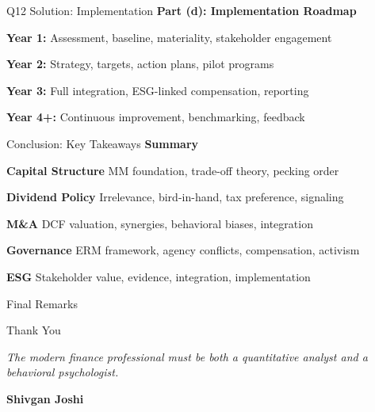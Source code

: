 \documentclass[aspectratio=169,10pt]{beamer}
\renewcommand{\small}{\fontsize{6pt}{7.5pt}\selectfont}
\renewcommand{\large}{\fontsize{8pt}{10pt}\selectfont}
\renewcommand{\Large}{\fontsize{9pt}{11pt}\selectfont}
\newcommand{\question}[1]{{\large\bfseries\color{crimson}#1}}
\begin{document}
	\begin{frame}{Q12 Solution: Implementation}
		\question{Part (d): Implementation Roadmap}
		\small
		
		\textbf{Year 1:} Assessment, baseline, materiality, stakeholder engagement
		
		\vspace{0.1cm}
		\textbf{Year 2:} Strategy, targets, action plans, pilot programs
		
		\vspace{0.1cm}
		\textbf{Year 3:} Full integration, ESG-linked compensation, reporting
		
		\vspace{0.1cm}
		\textbf{Year 4+:} Continuous improvement, benchmarking, feedback
	\end{frame}
	
	\begin{frame}{Conclusion: Key Takeaways}
		\question{Summary}
		\small
		
		\textbf{Capital Structure}
		MM foundation, trade-off theory, pecking order
		
		\vspace{0.1cm}
		\textbf{Dividend Policy}
		Irrelevance, bird-in-hand, tax preference, signaling
		
		\vspace{0.1cm}
		\textbf{M\&A}
		DCF valuation, synergies, behavioral biases, integration
		
		\vspace{0.1cm}
		\textbf{Governance}
		ERM framework, agency conflicts, compensation, activism
		
		\vspace{0.1cm}
		\textbf{ESG}
		Stakeholder value, evidence, integration, implementation
	\end{frame}
	
	\begin{frame}{Final Remarks}
		\begin{center}
			\Large\textcolor{navyblue}{Thank You}
			\vspace{0.2cm}
			
			\small
			\textit{The modern finance professional must be both a quantitative analyst and a behavioral psychologist.}
			\vspace{0.2cm}
			
			\large\textbf{Shivgan Joshi}
		\end{center}
	\end{frame}
	
\end{document}
